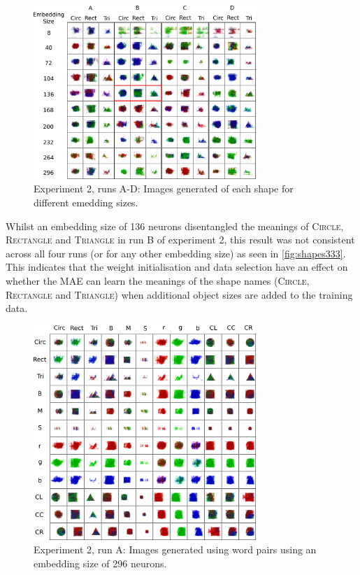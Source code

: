\begin{figure}[h]
\centering
\includegraphics[width=0.75\textwidth]{Figs/shapes/shapes333.png}
\caption{Experiment 2, runs A-D:  Images generated of each shape for different emedding sizes.}
\label{fig:shapes333}
\end{figure}

Whilst an embedding size of 136 neurons disentangled the meanings of \textsc{Circle}, \textsc{Rectangle} and \textsc{Triangle} in run B of experiment 2, this result was not consistent across all four runs (or for any other embedding size) as seen in \autoref{fig:shapes333}. This indicates that the weight initialisation and data selection have an effect on whether the \ac{MAE} can learn the meanings of the shape names (\textsc{Circle}, \textsc{Rectangle} and \textsc{Triangle}) when additional object sizes are added to the training data.


\begin{figure}[h]
\centering
\includegraphics[width=0.75\textwidth]{Figs/shapes/2word333A.png}
\caption{Experiment 2, run A:  Images generated using word pairs using an embedding size of 296 neurons.}
\label{fig:2word333}
\end{figure}

